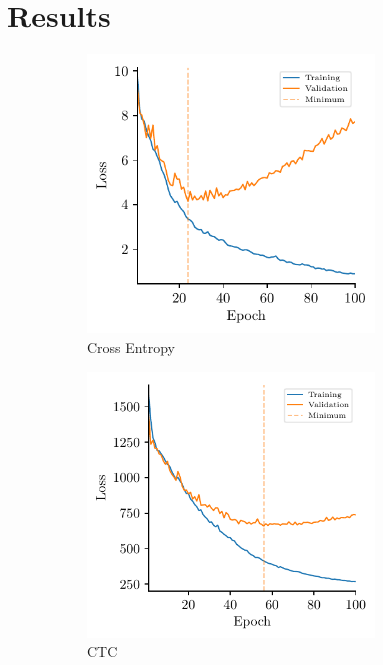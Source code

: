 \chapter{Results}
\label{cha:results}


\begin{figure}[h]
  \begin{subfigure}{3in}
  \centering
    \includegraphics[width=3in]{figures/results/losses/gru-gists}
    \caption{Cross Entropy}
  \end{subfigure}
  \hfill
  \begin{subfigure}{3in}
  \centering
    \includegraphics[width=3in]{figures/results/losses/ctc-gists}
    \caption{CTC}
  \end{subfigure}
  \caption{}
  \label{fig:loss-gists}
\end{figure}

